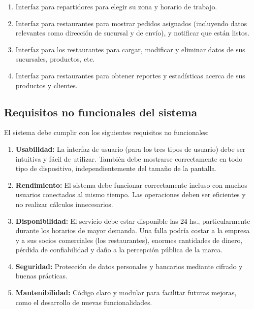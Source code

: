 \begin{enumerate}
    \item Interfaz para repartidores para elegir su zona y horario de trabajo.
    
    \item Interfaz para restaurantes para mostrar pedidos asignados (incluyendo datos relevantes como dirección de sucursal y de envío), y notificar que están listos.
    
    \item Interfaz para los restaurantes para cargar, modificar y eliminar datos de sus sucursales, productos, etc.
    
    \item Interfaz para restaurantes para obtener reportes y estadísticas acerca de sus productos y clientes.
    
\end{enumerate}

\subsection{Requisitos no funcionales del sistema}

El sistema debe cumplir con los siguientes requisitos no funcionales:

\begin{enumerate}
\item \textbf{Usabilidad:} La interfaz de usuario (para los tres tipos de usuario) debe ser intuitiva y fácil de utilizar. También debe mostrarse correctamente en todo tipo de dispositivo, independientemente del tamaño de la pantalla.

\item \textbf{Rendimiento:} El sistema debe funcionar correctamente incluso con muchos usuarios conectados al mismo tiempo. Las operaciones deben ser eficientes y no realizar cálculos innecesarios.

\item \textbf{Disponibilidad:} El servicio debe estar disponible las 24 hs., particularmente durante los horarios de mayor demanda. Una falla podría costar a la empresa y a sus socios comerciales (los restaurantes), enormes cantidades de dinero, pérdida de confiabilidad y daño a la percepción pública de la marca.

\item \textbf{Seguridad:} Protección de datos personales y bancarios mediante cifrado y buenas prácticas.

\item \textbf{Mantenibilidad:} Código claro y modular para facilitar futuras mejoras, como el desarrollo de nuevas funcionalidades.
\end{enumerate}


